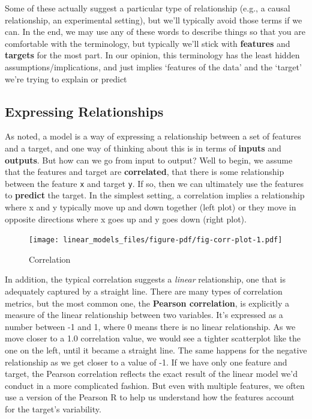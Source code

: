 \documentclass[
  letterpaper,
]{krantz}
\begin{document}
Some of these actually suggest a particular type of relationship (e.g.,
a causal relationship, an experimental setting), but we'll typically
avoid those terms if we can. In the end, we may use any of these words
to describe things so that you are comfortable with the terminology, but
typically we'll stick with \textbf{features} and \textbf{targets} for
the most part. In our opinion, this terminology has the least hidden
assumptions/implications, and just implies `features of the data' and
the `target' we're trying to explain or predict

\subsection{Expressing Relationships}\label{sec-lm-relationships}

As noted, a model is a way of expressing a relationship between a set of
features and a target, and one way of thinking about this is in terms of
\textbf{inputs} and \textbf{outputs}. But how can we go from input to
output? Well to begin, we assume that the features and target are
\textbf{correlated}, that there is some relationship between the feature
\texttt{x} and target \texttt{y}. If so, then we can ultimately use the
features to \textbf{predict} the target. In the simplest setting, a
correlation implies a relationship where x and y typically move up and
down together (left plot) or they move in opposite directions where x
goes up and y goes down (right plot).

\begin{figure}

{\centering \texttt{[image: linear\_models\_files/figure-pdf/fig-corr-plot-1.pdf]}

}

\caption{\label{fig-corr-plot}Correlation}

\end{figure}

In addition, the typical correlation suggests a \emph{linear}
relationship, one that is adequately captured by a straight line. There
are many types of correlation metrics, but the most common one, the
\textbf{Pearson correlation}, is explicitly a measure of the linear
relationship between two variables. It's expressed as a number between
-1 and 1, where 0 means there is no linear relationship. As we move
closer to a 1.0 correlation value, we would see a tighter scatterplot
like the one on the left, until it became a straight line. The same
happens for the negative relationship as we get closer to a value of -1.
If we have only one feature and target, the Pearson correlation reflects
the exact result of the linear model we'd conduct in a more complicated
fashion. But even with multiple features, we often use a version of the
Pearson R to help us understand how the features account for the
target's variability.
\end{document}
